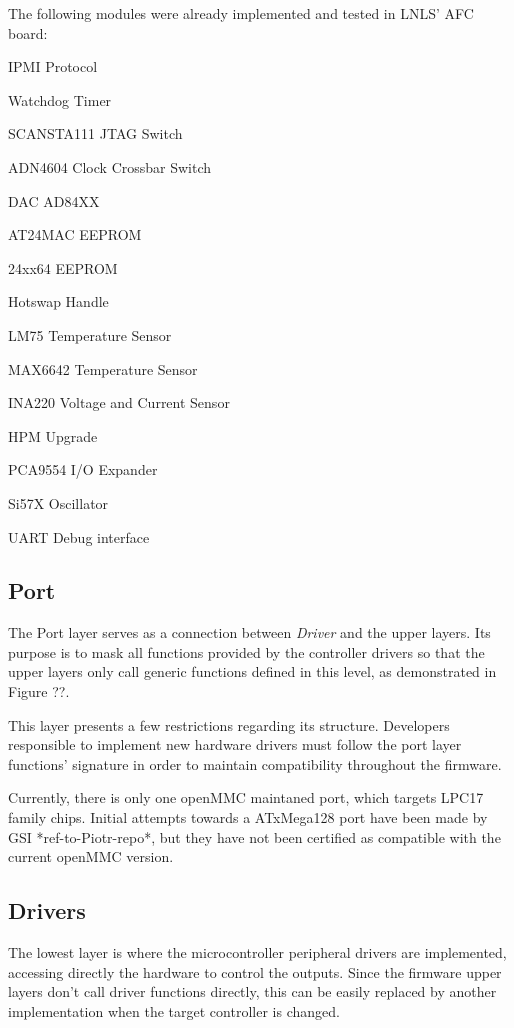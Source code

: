 \documentclass[a4paper,
              ]{jacow}
\begin{document}
The following modules were already implemented and tested in LNLS' AFC board:
\begin{Itemize}

\item IPMI Protocol
\item Watchdog Timer
\item SCANSTA111 JTAG Switch
\item ADN4604 Clock Crossbar Switch
\item DAC AD84XX
\item AT24MAC EEPROM
\item 24xx64 EEPROM
\item Hotswap Handle
\item LM75 Temperature Sensor
\item MAX6642 Temperature Sensor
\item INA220 Voltage and Current Sensor
\item HPM Upgrade
\item PCA9554 I/O Expander
\item Si57X Oscillator
\item UART Debug interface

\end{Itemize}

\subsection{Port}
The Port layer serves as a connection between \emph{Driver} and the upper layers.
Its purpose is to mask all functions provided by the controller drivers so that the upper layers only call generic functions defined in this level, as demonstrated in Figure ??.


This layer presents a few restrictions regarding its structure. Developers responsible to implement new hardware drivers must follow the port layer functions' signature in order to maintain compatibility throughout the firmware.

Currently, there is only one openMMC maintaned port, which targets LPC17 family chips.
Initial attempts towards a ATxMega128 port have been made by GSI *ref-to-Piotr-repo*, but they have not been certified as compatible with the current openMMC version.

\subsection{Drivers}
The lowest layer is where the microcontroller peripheral drivers are implemented, accessing directly the hardware to control the outputs.
Since the firmware upper layers don't call driver functions directly, this can be easily replaced by another implementation when the target controller is changed.
\end{document}

